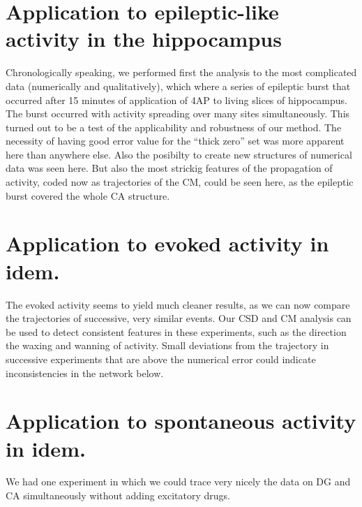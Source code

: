\documentclass{article}
\begin{document}
\section{Application to epileptic-like activity in the hippocampus}
Chronologically speaking, we performed first the analysis to the most complicated data (numerically and qualitatively), which where a series of epileptic burst that occurred after 15 minutes of application of 4AP to living slices of hippocampus. The burst occurred with activity spreading over many sites simultaneously. This turned out to be a test of the applicability and robustness of our method. The necessity of having good error value for the ``thick zero'' set was more apparent here than anywhere else. Also the posibilty to create new structures of numerical data was seen here.  But also the most strickig features of the propagation of activity, coded now as trajectories of the CM, could be seen here, as the epileptic burst covered the whole CA structure. 

\section{Application to evoked activity in idem.}

The evoked activity seems to yield much cleaner results, as we can now compare the trajectories of successive, very similar events. Our CSD and CM analysis can be used to detect consistent features in these experiments, such as the direction the waxing and wanning of activity. Small deviations from the trajectory in successive experiments that are above the numerical error could indicate inconsistencies in the network below. 

\section{Application to spontaneous activity in idem.}

We had one experiment in which we could trace very nicely the data on DG and CA simultaneously without adding excitatory drugs. 


 
\end{document}
